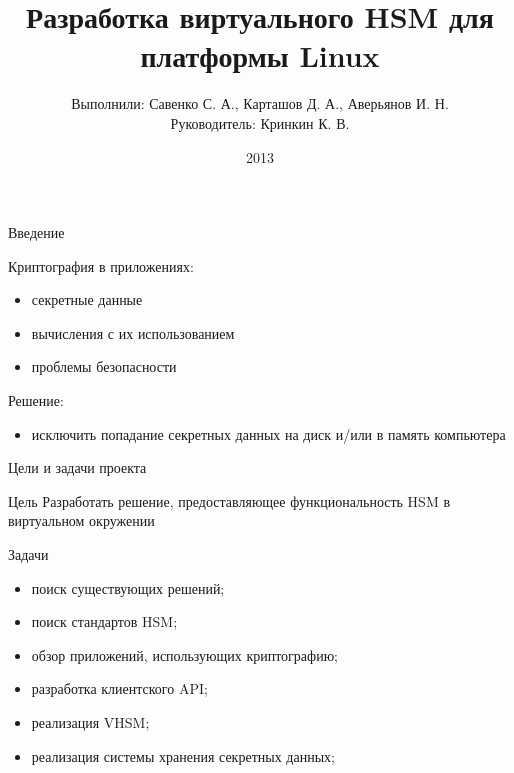 \documentclass[utf8, 11pt]{beamer}
\author[ ]{Выполнили: Савенко С. А., Карташов Д. А., Аверьянов И. Н. \\ Руководитель: Кринкин К. В.}
\title[Virtual HSM]{Разработка виртуального HSM для платформы Linux}
\institute[СПбАУ]
{
  Кафедра математических и информационных технологий\\
  Санкт-Петербургский Академический университет
}
\date{ 2013 }
\begin{document}
\begin{frame}
  \titlepage
\end{frame}

\begin{frame}{Введение}

Криптография в приложениях:
\begin{itemize}
\item секретные данные
\item вычисления с их использованием
\item проблемы безопасности
\end{itemize}

\vspace*{\fill}

Решение:
\begin{itemize}
\item исключить попадание секретных данных на диск и/или в память компьютера
\end{itemize}

\end{frame}

\begin{frame}{Цели и задачи проекта}

\begin{block}{Цель}
Разработать решение, предоставляющее функциональность HSM в виртуальном окружении
\end{block}

\vspace*{\fill}

\begin{block}{Задачи}
\begin{itemize}
\item поиск существующих решений;
\item поиск стандартов HSM;
\item обзор приложений, использующих криптографию;
\item разработка клиентского API;
\item реализация VHSM;
\item реализация системы хранения секретных данных;
\end{itemize}
\end{block}

\end{frame}
\end{document}
